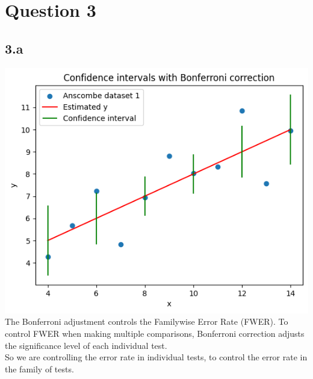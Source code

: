 \documentclass[12pt]{article}
\begin{document}
\newpage
\section*{Question 3}
\subsection*{3.a}
\includegraphics*[width=\linewidth]{graph3a}
The Bonferroni adjustment controls the Familywise Error Rate (FWER).
To control FWER when making multiple comparisons, Bonferroni correction adjusts
the significance level of each individual test.
\\
So we are controlling the error rate in individual tests, to control the
error rate in the family of tests.

\newpage
\end{document}
